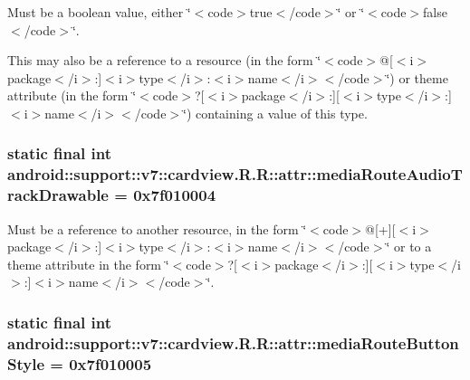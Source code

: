 Must be a boolean value, either \char`\"{}$<$code$>$true$<$/code$>$\char`\"{} or \char`\"{}$<$code$>$false$<$/code$>$\char`\"{}. 

This may also be a reference to a resource (in the form \char`\"{}$<$code$>$@\mbox{[}$<$i$>$package$<$/i$>$:\mbox{]}$<$i$>$type$<$/i$>$:$<$i$>$name$<$/i$>$$<$/code$>$\char`\"{}) or theme attribute (in the form \char`\"{}$<$code$>$?\mbox{[}$<$i$>$package$<$/i$>$:\mbox{]}\mbox{[}$<$i$>$type$<$/i$>$:\mbox{]}$<$i$>$name$<$/i$>$$<$/code$>$\char`\"{}) containing a value of this type. \hypertarget{classandroid_1_1support_1_1v7_1_1cardview_1_1_r_1_1attr_452bccf579df584f3beaf11fa5c4dcdd}{
\subsubsection[{mediaRouteAudioTrackDrawable}]{\setlength{\rightskip}{0pt plus 5cm}static final int android::support::v7::cardview.R.R::attr::mediaRouteAudioTrackDrawable = 0x7f010004}}
\label{classandroid_1_1support_1_1v7_1_1cardview_1_1_r_1_1attr_452bccf579df584f3beaf11fa5c4dcdd}


Must be a reference to another resource, in the form \char`\"{}$<$code$>$@\mbox{[}+\mbox{]}\mbox{[}$<$i$>$package$<$/i$>$:\mbox{]}$<$i$>$type$<$/i$>$:$<$i$>$name$<$/i$>$$<$/code$>$\char`\"{} or to a theme attribute in the form \char`\"{}$<$code$>$?\mbox{[}$<$i$>$package$<$/i$>$:\mbox{]}\mbox{[}$<$i$>$type$<$/i$>$:\mbox{]}$<$i$>$name$<$/i$>$$<$/code$>$\char`\"{}. \hypertarget{classandroid_1_1support_1_1v7_1_1cardview_1_1_r_1_1attr_f6286a03db239aa936e68171cf6be30d}{
\subsubsection[{mediaRouteButtonStyle}]{\setlength{\rightskip}{0pt plus 5cm}static final int android::support::v7::cardview.R.R::attr::mediaRouteButtonStyle = 0x7f010005}}
\label{classandroid_1_1support_1_1v7_1_1cardview_1_1_r_1_1attr_f6286a03db239aa936e68171cf6be30d}



